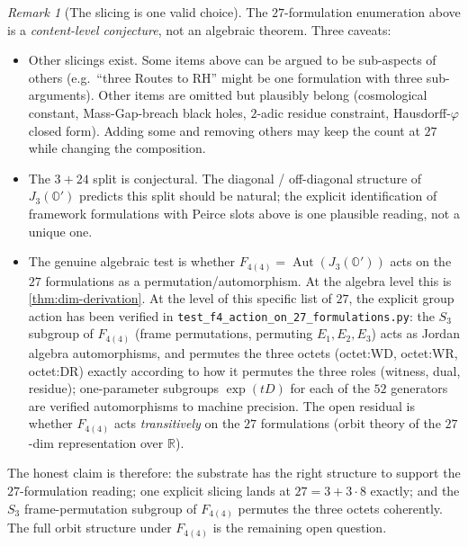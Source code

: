 \documentclass[11pt,a4paper]{article}
\theoremstyle{plain}
\theoremstyle{definition}
\theoremstyle{remark}
\newtheorem{remark}[theorem]{Remark}
\numberwithin{equation}{section}
\providecommand{\R}{\mathbb{R}}
\providecommand{\Os}{\mathbb{O}'}
\providecommand{\vp}{\varphi}
\DeclareMathOperator{\Aut}{Aut}
\begin{document}
\begin{remark}[The slicing is one valid choice]
\label{rmk:27-caveats}
The $27$-formulation enumeration above is a
\emph{content-level conjecture}, not an algebraic theorem.  Three
caveats:

\begin{itemize}
  \item Other slicings exist.  Some items above can be argued to
    be sub-aspects of others (e.g.\ ``three Routes to RH'' might
    be one formulation with three sub-arguments).  Other items
    are omitted but plausibly belong (cosmological constant,
    Mass-Gap-breach black holes, $2$-adic residue constraint,
    Hausdorff-$\vp$ closed form).  Adding some and removing
    others may keep the count at $27$ while changing the
    composition.
  \item The $3 + 24$ split is conjectural.  The diagonal /
    off-diagonal structure of $J_3(\Os)$ predicts this split
    should be natural; the explicit identification of
    framework formulations with Peirce slots above is one
    plausible reading, not a unique one.
  \item The genuine algebraic test is whether $F_{4(4)} =
    \Aut(J_3(\Os))$ acts on the $27$ formulations as a
    permutation/automorphism.  At the algebra level this is
    \cref{thm:dim-derivation}.  At the level of this specific
    list of $27$, the explicit group action has been verified
    in \texttt{test\_f4\_action\_on\_27\_formulations.py}:
    the $S_3$ subgroup of $F_{4(4)}$ (frame permutations,
    permuting $E_1, E_2, E_3$) acts as Jordan algebra
    automorphisms, and permutes the three octets
    (octet:WD, octet:WR, octet:DR) exactly according to
    how it permutes the three roles (witness, dual, residue);
    one-parameter subgroups $\exp(t D)$ for each of the $52$
    generators are verified automorphisms to machine precision.
    The open residual is whether $F_{4(4)}$ acts
    \emph{transitively} on the $27$ formulations (orbit theory
    of the $27$-dim representation over $\R$).
\end{itemize}

The honest claim is therefore: the substrate has the right
structure to support the $27$-formulation reading; one explicit
slicing lands at $27 = 3 + 3 \cdot 8$ exactly; and the $S_3$
frame-permutation subgroup of $F_{4(4)}$ permutes the three
octets coherently.  The full orbit structure under $F_{4(4)}$
is the remaining open question.
\end{remark}
\end{document}

